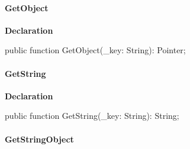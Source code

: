 \documentclass{report}
\newif\ifpdf
\begin{document}
\paragraph*{GetObject}\hspace*{\fill}

\label{PasDoc_Hashes.THash-GetObject}
\begin{list}{}{
\setlength{\itemindent}{0cm}
\setlength{\listparindent}{0cm}
\setlength{\leftmargin}{\evensidemargin}
\addtolength{\leftmargin}{\tmplength}
\settowidth{\labelsep}{X}
\addtolength{\leftmargin}{\labelsep}
\setlength{\labelwidth}{\tmplength}
}
\item[\textbf{Declaration}\hfill]
\ifpdf
\begin{flushleft}
\fi
\begin{ttfamily}
public function GetObject({\_}key: String): Pointer;\end{ttfamily}

\ifpdf
\end{flushleft}
\fi

\end{list}
\paragraph*{GetString}\hspace*{\fill}

\label{PasDoc_Hashes.THash-GetString}
\begin{list}{}{
\setlength{\itemindent}{0cm}
\setlength{\listparindent}{0cm}
\setlength{\leftmargin}{\evensidemargin}
\addtolength{\leftmargin}{\tmplength}
\settowidth{\labelsep}{X}
\addtolength{\leftmargin}{\labelsep}
\setlength{\labelwidth}{\tmplength}
}
\item[\textbf{Declaration}\hfill]
\ifpdf
\begin{flushleft}
\fi
\begin{ttfamily}
public function GetString({\_}key: String): String;\end{ttfamily}

\ifpdf
\end{flushleft}
\fi

\end{list}
\paragraph*{GetStringObject}\hspace*{\fill}
\end{document}
